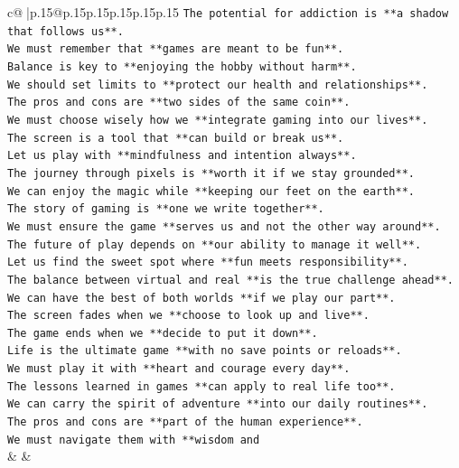 \documentclass{article}
\begin{document}
{\begin{supertabular}{c@{$\;$}|p{.15\linewidth}@{}p{.15\linewidth}p{.15\linewidth}p{.15\linewidth}p{.15\linewidth}p{.15\linewidth}}
{{{\texttt{The potential for addiction is **a shadow that follows us**.} \\
\texttt{We must remember that **games are meant to be fun**.} \\
\texttt{Balance is key to **enjoying the hobby without harm**.} \\
\texttt{We should set limits to **protect our health and relationships**.} \\
\texttt{The pros and cons are **two sides of the same coin**.} \\
\texttt{We must choose wisely how we **integrate gaming into our lives**.} \\
\texttt{The screen is a tool that **can build or break us**.} \\
\texttt{Let us play with **mindfulness and intention always**.} \\
\texttt{The journey through pixels is **worth it if we stay grounded**.} \\
\texttt{We can enjoy the magic while **keeping our feet on the earth**.} \\
\texttt{The story of gaming is **one we write together**.} \\
\texttt{We must ensure the game **serves us and not the other way around**.} \\
\texttt{The future of play depends on **our ability to manage it well**.} \\
\texttt{Let us find the sweet spot where **fun meets responsibility**.} \\
\texttt{The balance between virtual and real **is the true challenge ahead**.} \\
\texttt{We can have the best of both worlds **if we play our part**.} \\
\texttt{The screen fades when we **choose to look up and live**.} \\
\texttt{The game ends when we **decide to put it down**.} \\
\texttt{Life is the ultimate game **with no save points or reloads**.} \\
\texttt{We must play it with **heart and courage every day**.} \\
\texttt{The lessons learned in games **can apply to real life too**.} \\
\texttt{We can carry the spirit of adventure **into our daily routines**.} \\
\texttt{The pros and cons are **part of the human experience**.} \\
\texttt{We must navigate them with **wisdom and} \\
            }
        }
    }
    & & \\ \\


\end{supertabular}}
\end{document}
